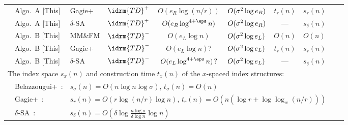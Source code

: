 \begin{minipage}{\textwidth}
\begin{tabular}{p{.5em}lp{7.8em}lc>{\centering}p{5em}c>{}p{5.9em}ll}
& Algo.~A [This]   	& Gagie+~\cite{gagie:navarro:prezza2020fully}	& $\idrm{TD}^{+}$ & $O(e_R \log(n/r))$	& $\mywspace $	
& $t_r(n)$  & $s_r(n)$ 	 
\\
& Algo.~A [This]   	& $\delta$-SA~\cite{kempa:kociumaka2023collapsing} & $\idrm{TD}^{+}$ & $O(e_R \log^{4+\eps} n)$	& $\mywspace $	
& ---    & $s_\delta(n)$	
\\
\midrule 
& Algo.~B [This]	& MM\cite{manber:myers1993suffixarrays}\&FM\cite{Ferragina05:FM} & $\idrm{TD}^{-}$ & $O(e_L\log n)$	& $\mywspace[L] $	& $O(n)$	& $O(n)$	 \\
& Algo.~B [This]   	& Gagie+~\cite{gagie:navarro:prezza2020fully}	& $\idrm{TD}^{-}$ & $O(e_L \log n)?$	& $\mywspace[L] $	
& $t_r(n)$  & $s_r(n)$ 	 \\
& Algo.~B [This]   	& $\delta$-SA~\cite{kempa:kociumaka2023collapsing} & $\idrm{TD}^{-}$ & $O(e_L \log^{4+\eps} n)$?	& $\mywspace[L] $   & ---    & $s_\delta(n)$ \\
\midrule 
\multicolumn{8}{l}{The index space $s_x(n)$ and construction time $t_x(n)$ of the $x$-spaced index structures: } \\
& Belazzougui+~\cite{belazzougui2020linear}: & \multicolumn{6}{l}{
$s_\sigma(n) = O(n\log n\log\sigma)$, 
$t_\sigma(n) = O(n)$ } \\ 
& Gagie+~\cite{gagie:navarro:prezza2020fully}: & \multicolumn{6}{l}{
$s_r(n) = O(r\log(n/r)\log n)$,  
$t_r(n) = O(n(\log r + \log\log_w(n/r)))$ } \\ 
& $\delta$-SA~\cite{kempa:kociumaka2023collapsing}: & \multicolumn{6}{l}{
$s_\delta(n) = O(\delta \log\frac{n\log\sigma}{\delta\log n} \log n)$ }\\
\bottomrule
\end{tabular}
\end{minipage}


